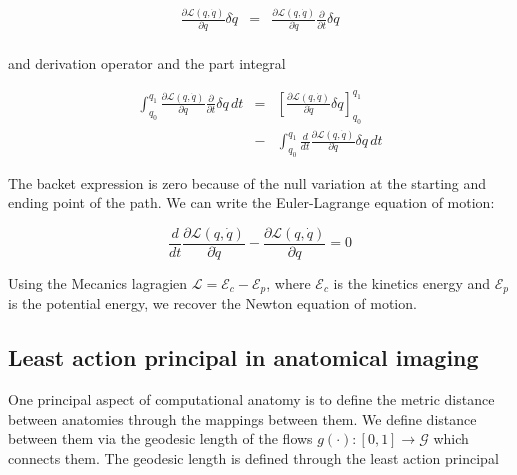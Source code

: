 \documentclass[final, paper=letter,5p,times,twocolumn]{elsarticle}
\newcommand{\CA}{computational anatomy}
\theoremstyle{definition}
\begin{document}
\begin{eqnarray*}
    \frac{\partial\mathcal{L}(q, \dot{q})}{\partial \dot{q}} \delta \dot{q} & = & \frac{\partial\mathcal{L}(q, \dot{q})}{\partial \dot{q}} \frac{\partial }{\partial t} \delta q \\
\end{eqnarray*}


and derivation operator and the part integral

\begin{eqnarray*}
    \int_{q_{0}}^{q_{1}} \frac{\partial\mathcal{L}(q, \dot{q})}{\partial \dot{q}} \frac{\partial }{\partial t} \delta q  \, dt & = & \left \lbrack \frac{\partial\mathcal{L}(q, \dot{q})}{\partial \dot{q}} \delta q \right \rbrack_{q_{0}}^{q_{1}} \\
    & - &  \int_{q_{0}}^{q_{1}} \frac{d}{dt} \frac{\partial\mathcal{L}(q, \dot{q})}{\partial \dot{q}} \delta q \, dt
\end{eqnarray*}

The backet expression is zero because of the null variation at the starting and ending point of the path. We can write the Euler-Lagrange equation of motion:

$$
\frac{d}{dt} \frac{\partial\mathcal{L}(q, \dot{q})}{\partial \dot{q}} - \frac{\partial\mathcal{L}(q, \dot{q})}{\partial q} = 0 
\label{Euler_Lagrange}
$$

Using the Mecanics lagragien $\mathcal{L} = \mathcal{E}_{c} - \mathcal{E}_{p}$, where $\mathcal{E}_{c}$ is the kinetics energy and $\mathcal{E}_{p}$ is the potential energy, we recover the Newton equation of motion.  


\subsection{Least action principal in anatomical imaging}




One principal aspect of \CA{} is to define the metric distance between anatomies through the mappings between them. We define distance between them via the geodesic length of the flows $g(\cdot): [0, 1] \rightarrow \mathcal{G}$ which connects them. The geodesic length is defined through the least action principal 
\end{document}
